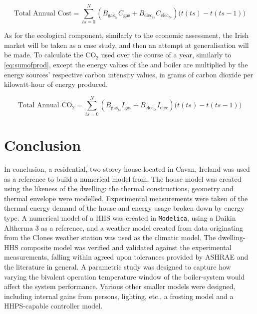 \begin{equation}
    \text{Total Annual Cost} = \sum_{\mathit{ts}=0}^{N} \left(B_{\text{gas}_\mathit{ts}}  C_\text{gas} + B_{\text{elec}_\mathit{ts}} C_{\text{elec}_\mathit{ts}} \right)\bigl(t(\mathit{ts})-t(\mathit{ts}-1)\bigr)\label{eq:sumofprod}
\end{equation}

As for the ecological component, similarly to the economic assessment, the Irish market will be taken as a case study, and then an attempt at generalisation will be made. To calculate the $\text{CO}_2$ used over the course of a year, similarly to \cref{eq:sumofprod}, except the energy values of the \HP and boiler are multiplied by the energy sources' respective carbon intensity values, in grams of carbon dioxide per kilowatt-hour of energy produced. 

\begin{equation}
    \text{Total Annual CO}_2 = \sum_{\mathit{ts}=0}^{N} \left(B_{\text{gas}_\mathit{ts}} I_\text{gas} + B_{\text{elec}_\mathit{ts}} I_{\text{elec}} \right)\bigl(t(\mathit{ts})-t(\mathit{ts}-1)\bigr)\label{eq:sumofprodeco}
\end{equation}

\section{Conclusion}\label{sec:methodconclusion}
In conclusion, a residential, two-storey house located in Cavan, Ireland was used as a reference to build a numerical model from. The house model was created using the likeness of the dwelling: the thermal constructions, geometry and thermal envelope were modelled. Experimental measurements were taken of the thermal energy demand of the house and energy usage broken down by energy type. A numerical model of a \ac{HHS} was created in \texttt{Modelica}, using a Daikin Altherma 3 \HP as a reference, and a weather model created from data originating from the Clones weather station was used as the climatic model. The dwelling-\ac{HHS} composite model was verified and validated against the experimental measurements, falling within agreed upon tolerances provided by ASHRAE and the literature in general. A parametric study was designed to capture how varying the bivalent operation temperature window of the boiler-\HP system would affect the system performance. Various other smaller models were designed, including internal gains from persons, lighting, etc., a frosting model and a \ac{HHPS}-capable controller model. 



